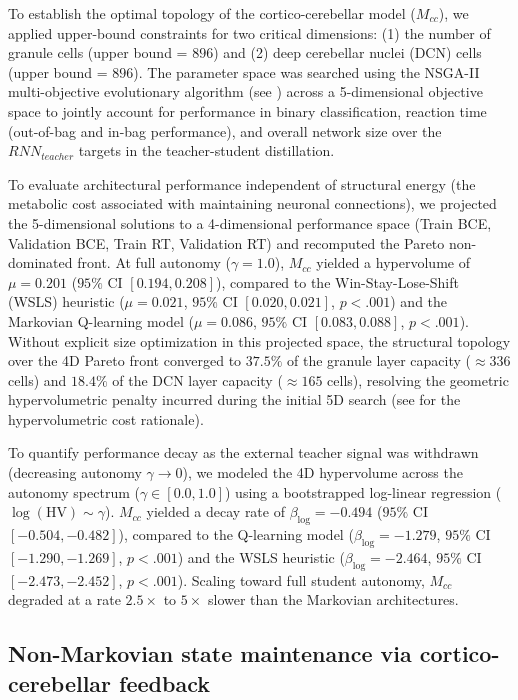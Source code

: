 \documentclass[12pt, a4paper]{extarticle}
\begin{document}
To establish the optimal topology of the cortico-cerebellar model ($M_{cc}$), we applied upper-bound constraints for two critical dimensions: (1) the number of granule cells (upper bound = $896$) and (2) deep cerebellar nuclei (DCN) cells (upper bound = $896$). The parameter space was searched using the NSGA-II multi-objective evolutionary algorithm (see ) across a 5-dimensional objective space to jointly account for performance in binary classification, reaction time (out-of-bag and in-bag performance), and overall network size over the $RNN_{teacher}$ targets in the teacher-student distillation. 

To evaluate architectural performance independent of structural energy (the metabolic cost associated with maintaining neuronal connections), we projected the 5-dimensional solutions to a 4-dimensional performance space (Train BCE, Validation BCE, Train RT, Validation RT) and recomputed the Pareto non-dominated front. At full autonomy ($\gamma = 1.0$), $M_{cc}$ yielded a hypervolume of $\mu = 0.201$ ($95\%$ CI $[0.194, 0.208]$), compared to the Win-Stay-Lose-Shift (WSLS) heuristic ($\mu = 0.021$, $95\%$ CI $[0.020, 0.021]$, $p < .001$) and the Markovian Q-learning model ($\mu = 0.086$, $95\%$ CI $[0.083, 0.088]$, $p < .001$). Without explicit size optimization in this projected space, the structural topology over the 4D Pareto front converged to $37.5\%$ of the granule layer capacity ($\approx 336$ cells) and $18.4\%$ of the DCN layer capacity ($\approx 165$ cells), resolving the geometric hypervolumetric penalty incurred during the initial 5D search (see  for the hypervolumetric cost rationale).

To quantify performance decay as the external teacher signal was withdrawn (decreasing autonomy $\gamma \rightarrow 0$), we modeled the 4D hypervolume across the autonomy spectrum ($\gamma \in [0.0, 1.0]$) using a bootstrapped log-linear regression ($\log(\text{HV}) \sim \gamma$). $M_{cc}$ yielded a decay rate of $\beta_{\text{log}} = -0.494$ ($95\%$ CI $[-0.504, -0.482]$), compared to the Q-learning model ($\beta_{\text{log}} = -1.279$, $95\%$ CI $[-1.290, -1.269]$, $p < .001$) and the WSLS heuristic ($\beta_{\text{log}} = -2.464$, $95\%$ CI $[-2.473, -2.452]$, $p < .001$). Scaling toward full student autonomy, $M_{cc}$ degraded at a rate $2.5\times$ to $5\times$ slower than the Markovian architectures.

\subsection{Non-Markovian state maintenance via cortico-cerebellar feedback}
\end{document}
